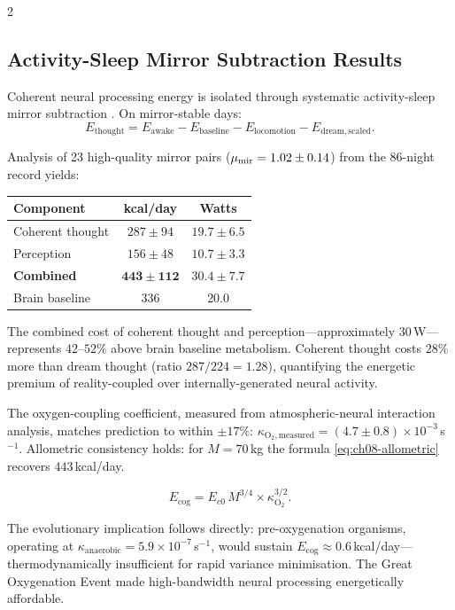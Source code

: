 \begin{multicols}{2}
\subsection{Activity-Sleep Mirror Subtraction Results}

Coherent neural processing energy is isolated through systematic activity-sleep mirror subtraction \citep{sachikonye2024_metabolic}. On mirror-stable days:
\begin{equation}
E_{\mathrm{thought}} = E_{\mathrm{awake}} - E_{\mathrm{baseline}} - E_{\mathrm{locomotion}} - E_{\mathrm{dream,scaled}}.
\label{eq:ch08-subtraction}
\end{equation}

Analysis of 23 high-quality mirror pairs ($\mu_{\mathrm{mir}} = 1.02 \pm 0.14$) from the 86-night record yields:

\begin{center}
\small
\begin{tabular}{lcc}
\toprule
\textbf{Component} & \textbf{kcal/day} & \textbf{Watts} \\
\midrule
Coherent thought & $287 \pm 94$ & $19.7 \pm 6.5$ \\
Perception & $156 \pm 48$ & $10.7 \pm 3.3$ \\
\midrule
\textbf{Combined} & $\mathbf{443 \pm 112}$ & $\mathbf{30.4 \pm 7.7}$ \\
Brain baseline & $336$ & $20.0$ \\
\bottomrule
\end{tabular}
\end{center}

The combined cost of coherent thought and perception---approximately $30$\,W---represents $42$--$52\%$ above brain baseline metabolism. Coherent thought costs $28\%$ more than dream thought (ratio $287/224 = 1.28$), quantifying the energetic premium of reality-coupled over internally-generated neural activity.

The oxygen-coupling coefficient, measured from atmospheric-neural interaction analysis, matches prediction to within $\pm 17\%$: $\kappa_{\mathrm{O_2,measured}} = (4.7 \pm 0.8) \times 10^{-3}$\,s$^{-1}$. Allometric consistency holds: for $M = 70$\,kg the formula \eqref{eq:ch08-allometric} recovers $443$\,kcal/day.

\begin{equation}
E_{\mathrm{cog}} = E_{c0}\,M^{3/4} \times \kappa_{\mathrm{O_2}}^{3/2}.
\label{eq:ch08-allometric}
\end{equation}

The evolutionary implication follows directly: pre-oxygenation organisms, operating at $\kappa_{\mathrm{anaerobic}} = 5.9\times 10^{-7}$\,s$^{-1}$, would sustain $E_{\mathrm{cog}} \approx 0.6$\,kcal/day---thermodynamically insufficient for rapid variance minimisation. The Great Oxygenation Event made high-bandwidth neural processing energetically affordable.

\end{multicols}

